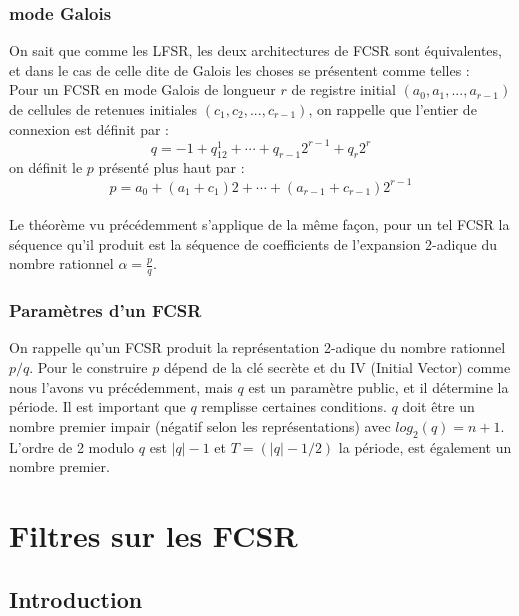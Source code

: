\documentclass[11pt]{report}
\begin{document}
\subsection{mode Galois}
On sait que comme les LFSR, les deux architectures de FCSR sont équivalentes, et dans le cas de celle dite de Galois les choses se présentent comme telles : 
\\
Pour un FCSR en mode Galois de longueur $r$ de registre initial $(a_0,a_1, ... , a_{r-1})$ de cellules de retenues initiales $(c_1,c_2, ...,c_{r-1})$, on rappelle que l'entier de connexion est définit par :
$$
q = -1 + q_12^1 + \cdots + q_{r-1}2^{r-1} + q_r2^r
$$
 on définit le $p$ présenté plus haut par : 
$$
p= a_0 + (a_1 + c_1)2 + \cdots + (a_{r-1} + c_{r-1})2^{r-1}
$$
\\
Le théorème vu précédemment s'applique de la même façon, pour un tel FCSR la séquence qu'il produit est la séquence de coefficients de l'expansion 2-adique du nombre rationnel $\alpha = \frac{p}{q}$.

\subsection{Paramètres d'un FCSR}

On rappelle qu'un FCSR produit la représentation 2-adique du nombre rationnel $p/q$. Pour le construire $p$ dépend de la clé secrète et du IV (Initial Vector) comme nous l'avons vu précédemment, mais $q$ est un paramètre public, et il détermine la période. Il est important que $q$ remplisse certaines conditions. $q$ doit être un nombre premier impair (négatif selon les représentations) avec $log_2(q)=n+1$. L'ordre de 2 modulo $q$ est $|q| - 1$ et $T=(|q|-1/2)$ la période, est également un nombre premier. 


\chapter{Filtres sur les FCSR}

\section{Introduction}
	
\end{document}
